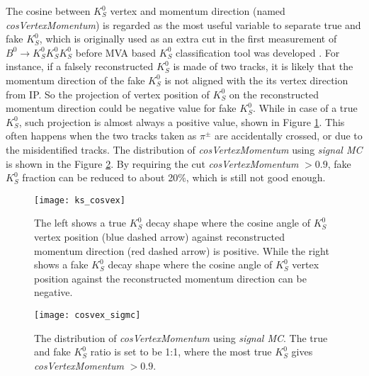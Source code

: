 The cosine between $K_S^0$ vertex and momentum direction (named \textit{cosVertexMomentum}) is regarded as the most useful variable to separate true and fake $K_S^0$, which is originally used as an extra cut in the first measurement of $B^0 \to K_S^0  K_S^0  K_S^0$ before MVA based $K_S^0$ classification tool was developed \cite{Sumisawa_2005}. For instance, if a falsely reconstructed $K_S^0$ is made of two tracks, it is likely that the momentum direction of the fake $K_S^0$ is not aligned with the its vertex direction from IP. So the projection of vertex position of $K_S^0$ on the reconstructed momentum direction could be negative value for fake $K_S^0$. While in case of a true $K_S^0$, such projection is almost always a positive value, shown in Figure \ref{fig:ks_cosvex}. This often happens when the two tracks taken as $\pi^{\pm}$ are accidentally crossed, or due to the misidentified tracks. The distribution of \textit{cosVertexMomentum} using \textit{signal MC} is shown in the Figure \ref{fig:cosvex_sigmc}. By requiring the cut \textit{cosVertexMomentum} $>0.9$, fake $K_S^0$ fraction can be reduced to about 20\%, which is still not good enough.


\begin{figure}[htbp]
	\centering
	\texttt{[image: ks\_cosvex]}
	\caption{The left shows a true $K_S^0$ decay shape where the cosine angle of $K_S^0$ vertex position (blue dashed arrow) against reconstructed momentum direction (red dashed arrow) is positive. While the right shows a fake $K_S^0$ decay shape where the cosine angle of $K_S^0$ vertex position against the reconstructed momentum direction can be negative. }
	\label{fig:ks_cosvex}
\end{figure}

\begin{figure}[htbp]
	\centering
	\texttt{[image: cosvex\_sigmc]}
	\caption{The distribution of \textit{cosVertexMomentum} using \textit{signal MC}. The true and fake $K_S^0$ ratio is set to be 1:1, where the most true $K_S^0$ gives  \textit{cosVertexMomentum} $>0.9$.}
	\label{fig:cosvex_sigmc}
\end{figure}


